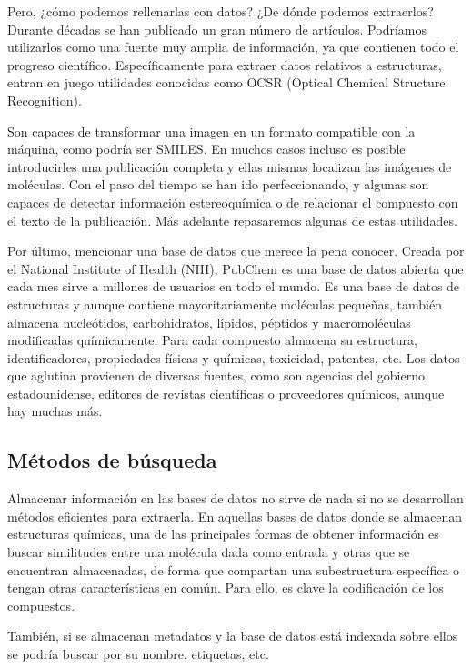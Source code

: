 Pero, ¿cómo podemos rellenarlas con datos? ¿De dónde podemos extraerlos? Durante décadas se han publicado un gran número de artículos. Podríamos utilizarlos como una fuente muy amplia de información, ya que contienen todo el progreso científico. Específicamente para extraer datos relativos a estructuras, entran en juego utilidades conocidas como OCSR (Optical Chemical Structure Recognition).

Son capaces de transformar una imagen en un formato compatible con la máquina, como podría ser SMILES. En muchos casos incluso es posible introducirles una publicación completa y ellas mismas localizan las imágenes de moléculas. Con el paso del tiempo se han ido perfeccionando, y algunas son capaces de detectar información estereoquímica o de relacionar el compuesto con el texto de la publicación. Más adelante repasaremos algunas de estas utilidades. 

Por último, mencionar una base de datos que merece la pena conocer. Creada por el National Institute of Health (NIH), PubChem es una base de datos abierta que cada mes sirve a millones de usuarios en todo el mundo. Es una base de datos de estructuras y aunque contiene mayoritariamente moléculas pequeñas, también almacena nucleótidos, carbohidratos, lípidos, péptidos y macromoléculas modificadas químicamente. Para cada compuesto almacena su estructura, identificadores, propiedades físicas y químicas, toxicidad, patentes, etc. Los datos que aglutina provienen de diversas fuentes, como son agencias del gobierno estadounidense, editores de revistas científicas o proveedores químicos, aunque hay muchas más. \cite{pubchem}

\subsection{Métodos de búsqueda}
Almacenar información en las bases de datos no sirve de nada si no se desarrollan métodos eficientes para extraerla. En aquellas bases de datos donde se almacenan estructuras químicas, una de las principales formas de obtener información es buscar similitudes entre una molécula dada como entrada y otras que se encuentran almacenadas, de forma que compartan una subestructura específica o tengan otras características en común. Para ello, es clave la codificación de los compuestos.

También, si se almacenan metadatos y la base de datos está indexada sobre ellos se podría buscar por su nombre, etiquetas, etc. \cite{doi:10.1021/ci600234z}

